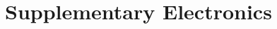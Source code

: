 \documentclass[12pt, a4paper, twoside]{book}
\begin{document}



\section{Supplementary Electronics}
\end{document}
